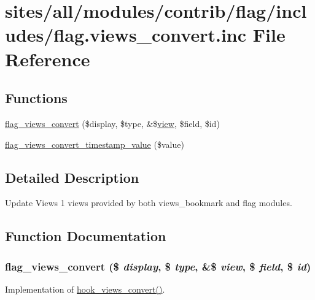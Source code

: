 \hypertarget{flag_8views__convert_8inc}{
\section{sites/all/modules/contrib/flag/includes/flag.views\_\-convert.inc File Reference}
\label{flag_8views__convert_8inc}
}
\subsection*{Functions}
\begin{CompactItemize}
\item 
\hyperlink{flag_8views__convert_8inc_6fcd7434ef6cae3b822e1f8e2633b63a}{flag\_\-views\_\-convert} (\$display, \$type, \&\$\hyperlink{classview}{view}, \$field, \$id)
\item 
\hyperlink{flag_8views__convert_8inc_cab0389970f9bad22da831d1ef2ee0db}{flag\_\-views\_\-convert\_\-timestamp\_\-value} (\$value)
\end{CompactItemize}


\subsection{Detailed Description}
Update Views 1 views provided by both views\_\-bookmark and flag modules. 

\subsection{Function Documentation}
\hypertarget{flag_8views__convert_8inc_6fcd7434ef6cae3b822e1f8e2633b63a}{
\subsubsection[{flag\_\-views\_\-convert}]{\setlength{\rightskip}{0pt plus 5cm}flag\_\-views\_\-convert (\$ {\em display}, \/  \$ {\em type}, \/  \&\$ {\em view}, \/  \$ {\em field}, \/  \$ {\em id})}}
\label{flag_8views__convert_8inc_6fcd7434ef6cae3b822e1f8e2633b63a}


Implementation of \hyperlink{group__views__hooks_ge98b0a1c700fe1406af390dfc8c7262e}{hook\_\-views\_\-convert()}.

